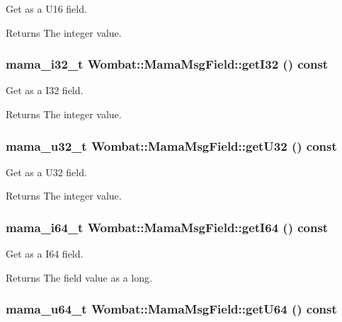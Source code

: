 Get as a U16 field. \begin{DoxyReturn}{Returns}
The integer value. 
\end{DoxyReturn}
\hypertarget{classWombat_1_1MamaMsgField_a47107271fb9a9a9aa08c4a0619800462}{
\subsubsection[{getI32}]{\setlength{\rightskip}{0pt plus 5cm}mama\_\-i32\_\-t Wombat::MamaMsgField::getI32 () const}}
\label{classWombat_1_1MamaMsgField_a47107271fb9a9a9aa08c4a0619800462}


Get as a I32 field. \begin{DoxyReturn}{Returns}
The integer value. 
\end{DoxyReturn}
\hypertarget{classWombat_1_1MamaMsgField_afe41c5a1eebf834ebf3743fc6566cd5a}{
\subsubsection[{getU32}]{\setlength{\rightskip}{0pt plus 5cm}mama\_\-u32\_\-t Wombat::MamaMsgField::getU32 () const}}
\label{classWombat_1_1MamaMsgField_afe41c5a1eebf834ebf3743fc6566cd5a}


Get as a U32 field. \begin{DoxyReturn}{Returns}
The integer value. 
\end{DoxyReturn}
\hypertarget{classWombat_1_1MamaMsgField_a41056ff06fd0510b8df0286b93c094ac}{
\subsubsection[{getI64}]{\setlength{\rightskip}{0pt plus 5cm}mama\_\-i64\_\-t Wombat::MamaMsgField::getI64 () const}}
\label{classWombat_1_1MamaMsgField_a41056ff06fd0510b8df0286b93c094ac}


Get as a I64 field. \begin{DoxyReturn}{Returns}
The field value as a long. 
\end{DoxyReturn}
\hypertarget{classWombat_1_1MamaMsgField_a9f0c2b96b08d00bdcfbbd6e6f26450e3}{
\subsubsection[{getU64}]{\setlength{\rightskip}{0pt plus 5cm}mama\_\-u64\_\-t Wombat::MamaMsgField::getU64 () const}}
\label{classWombat_1_1MamaMsgField_a9f0c2b96b08d00bdcfbbd6e6f26450e3}


